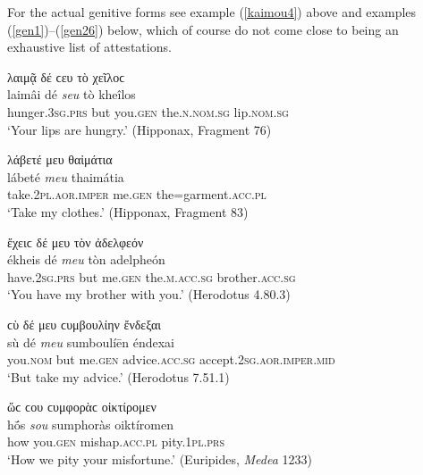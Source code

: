 For the actual genitive forms see example (\ref{kaimou4}) above and examples (\ref{gen1})--(\ref{gen26}) below, which of course do not come close to being an exhaustive list of attestations.

\begin{exe}
\ex λαιμᾷ δέ ϲευ τὸ χεῖλοϲ\\
\gll laimâi dé \emph{seu} tò kheîlos\\
hunger.\textsc{3sg.prs} but you.\textsc{gen} the.\textsc{n.nom.sg} lip.\textsc{nom.sg}\\
\trans `Your lips are hungry.' (Hipponax, Fragment 76)
\label{gen1}
\end{exe}

\begin{exe}
\ex λάβετέ μευ θαἰμάτια\\
\gll lábeté \emph{meu} thaimátia\\
take.\textsc{2pl.aor.imper} me.\textsc{gen} the=garment.\textsc{acc.pl}\\
\trans `Take my clothes.' (Hipponax, Fragment 83)
\label{gen2}
\end{exe}

\begin{exe}
\ex ἔχειϲ δέ μευ τὸν ἀδελφεόν\\
\gll ékheis dé \emph{meu} tòn adelpheón\\
have.\textsc{2sg.prs} but me.\textsc{gen} the.\textsc{m.acc.sg} brother.\textsc{acc.sg}\\
\trans `You have my brother with you.' (Herodotus 4.80.3)
\label{gen3}
\end{exe}

\begin{exe}
\ex ϲὺ δέ μευ ϲυμβουλίην ἔνδεξαι\\
\gll sù dé \emph{meu} sumboulíēn éndexai\\
you.\textsc{nom} but me.\textsc{gen} advice.\textsc{acc.sg} accept.\textsc{2sg.aor.imper.mid}\\
\trans `But take my advice.' (Herodotus 7.51.1)
\label{gen4}
\end{exe}

\begin{exe}
\ex ὥϲ ϲου ϲυμφορὰϲ οἰκτίρομεν\\
\gll hṓs \emph{sou} sumphoràs oiktíromen\\
how you.\textsc{gen} mishap.\textsc{acc.pl} pity.\textsc{1pl.prs}\\
\trans `How we pity your misfortune.' (Euripides, \textit{Medea} 1233)
\label{gen5}
\end{exe}

